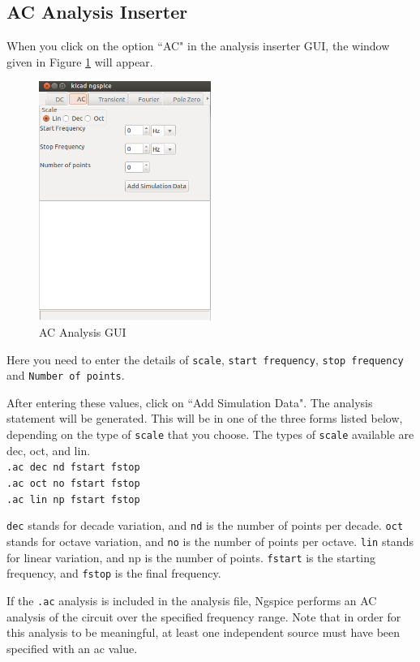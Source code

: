 \subsection{AC Analysis Inserter}
When you click on the option ``AC" in the analysis inserter GUI, the window given in Figure \ref{4} will appear.
\begin{figure}[t]
\centering
\includegraphics[width=0.5\textwidth]{figures/4}
\caption{AC Analysis GUI}
\label{4}
\end{figure}
Here you need to enter the details of {\tt scale}, {\tt start frequency}, {\tt stop frequency} and {\tt Number of points}.

After entering these values, click on ``Add Simulation Data". The analysis statement will be generated. This will be in one of the three forms listed below, depending on the type of {\tt scale} that you choose. The types of {\tt scale} available are dec, oct, and lin. \\
{\tt .ac dec nd fstart fstop }\\ 
{\tt .ac oct no fstart fstop }\\
{\tt .ac lin np fstart fstop }

{\tt dec} stands for decade variation, and {\tt nd} is the number of points per decade. {\tt oct} stands for octave variation, and {\tt no} is the number of points per octave. {\tt lin} stands for linear variation, and np is the number of points. {\tt fstart} is the starting frequency, and {\tt fstop} is the final frequency. 

If the {\tt .ac} analysis is included in the analysis file, Ngspice performs an AC analysis of the circuit over the specified frequency range. Note that in order for this analysis to be meaningful, at least one independent source must have been specified with an ac value.

